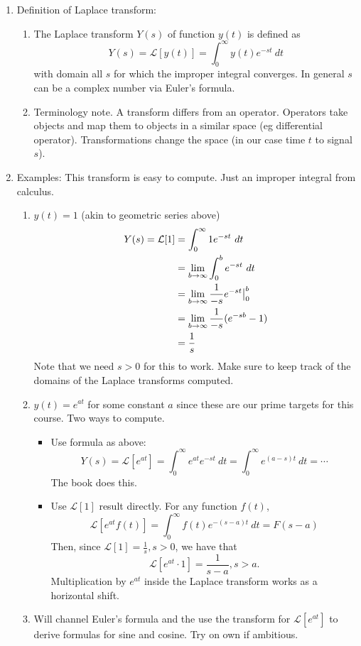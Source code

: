 \documentclass{article}
\begin{document}
\begin{enumerate}
\item Definition of Laplace transform:
\begin{enumerate}
\item The Laplace transform $Y(s)$ of function $y(t)$ is defined as
\[
Y(s) = \mathcal{L}[y(t)] = \int_0^{\infty} y(t) e^{-st}~dt
\]
with domain all $s$ for which the improper integral converges. In general $s$ can be a complex number via Euler's formula.
\item Terminology note. A transform differs from an operator. Operators take objects and map them to objects in a similar space (eg differential operator). Transformations change the space (in our case time $t$ to signal $s$).
\end{enumerate}

\item Examples: This transform is easy to compute. Just an improper integral from calculus.
\begin{enumerate}
\item $y(t)=1$ (akin to geometric series above)
\begin{align*}
Y(s)=\mathcal{L}[1] &= \int_0^{\infty} 1 e^{-st}~dt \\
&= \lim_{b\rightarrow\infty}\int_0^{b} e^{-st}~dt \\
&= \lim_{b\rightarrow\infty} \frac{1}{-s} e^{-st} \big{|}_0^b \\
&= \lim_{b\rightarrow\infty} \frac{1}{-s} (e^{-sb} - 1) \\
&= \frac{1}{s}
\end{align*}
Note that we need $s>0$ for this to work. Make sure to keep track of the domains of the Laplace transforms computed.
\item $y(t)=e^{at}$ for some constant $a$ since these are our prime targets for this course. Two ways to compute.
\begin{itemize} 
\item Use formula as above:
\[
Y(s)=\mathcal{L}[e^{at}] = \int_0^{\infty} e^{at} e^{-st}~dt = \int_0^{\infty} e^{(a-s)t} ~dt  = \cdots
\]
The book does this.
\item Use $\mathcal{L}[1]$ result directly. For any function $f(t)$, 
\[
\mathcal{L}[e^{at}f(t)] = \int_0^{\infty} f(t) e^{-(s-a)t}~dt = F(s-a)
\]
Then, since  $\mathcal{L}[1]=\frac{1}{s}, s>0$, we have that  
\[
\mathcal{L}[e^{at} \cdot 1] = \frac{1}{s-a}, s>a.
\]
Multiplication by $e^{at}$ inside the Laplace transform works as a horizontal shift.
\end{itemize}
\item Will channel Euler's formula and the use the transform for $\mathcal{L}[e^{at}]$ to derive formulas for sine and cosine. Try on own if ambitious.
\end{enumerate}



\end{enumerate}
\end{document}
